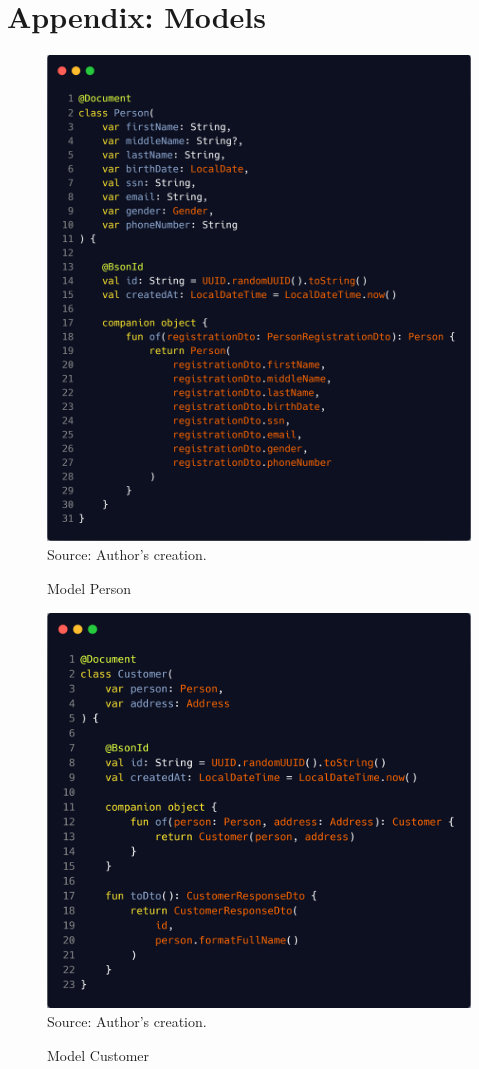 \section{Appendix: Models}
\label{appendix:models}

\begin{figure}[H]
	\centering
	\caption{Model Person}
	\includegraphics[width=1\linewidth]{figures/person}
	\label{fig:person}
	\footnotesize Source: Author's creation.
\end{figure}

\begin{figure}[H]
	\centering
	\caption{Model Customer}
	\includegraphics[width=1\linewidth]{figures/customer}
	\label{fig:customer}
	\footnotesize Source: Author's creation.
\end{figure}

